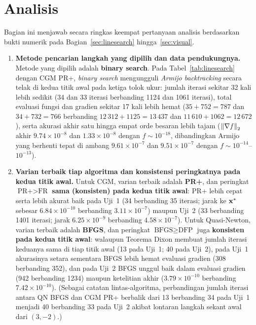 \documentclass[12pt,a4paper]{article}
\begin{document}
\section{Analisis}\label{sec:analisis}
Bagian ini menjawab secara ringkas keempat pertanyaan analisis berdasarkan bukti numerik pada Bagian~\ref{sec:linesearch}
hingga~\ref{sec:visual}.

\begin{enumerate}
  \item \textbf{Metode pencarian langkah yang dipilih dan data pendukungnya.}
  Metode yang dipilih adalah \textbf{binary search}. Pada Tabel~\ref{tab:linesearch} dengan CGM PR+, \emph{binary
  search} mengungguli \emph{Armijo backtracking} secara telak di kedua titik awal pada ketiga tolok ukur: jumlah
  iterasi sekitar 32 kali lebih sedikit (34 dan 33 iterasi berbanding 1124 dan 1061 iterasi), total evaluasi fungsi
  dan gradien sekitar 17 kali lebih hemat ($35+752=787$ dan $34+732=766$ berbanding $12\,312+1125=13\,437$ dan
  $11\,610+1062=12\,672$), serta akurasi akhir satu hingga empat orde besaran lebih tajam ($\left\lVert \nabla f\right\rVert_2$ akhir
  $9.74\times10^{-8}$ dan $1.33\times10^{-8}$ dengan $f\sim10^{-18}$, dibandingkan Armijo yang berhenti tepat di ambang
  $9.61\times10^{-7}$ dan $9.51\times10^{-7}$ dengan $f\sim10^{-14}$--$10^{-13}$).

  \item \textbf{Varian terbaik tiap algoritma dan konsistensi peringkatnya pada kedua titik awal.}
  Untuk CGM, varian terbaik adalah \textbf{PR+}, dan peringkat $\text{PR+}>\text{FR}$ \textbf{sama (konsisten) pada
  kedua titik awal}: PR+ lebih cepat serta lebih akurat baik pada Uji~1 (34 berbanding 35 iterasi; jarak ke $\mathbf{x}^*$
  sebesar $6.84\times10^{-10}$ berbanding $3.11\times10^{-7}$) maupun Uji~2 (33 berbanding 1401 iterasi; jarak
  $6.25\times10^{-9}$ berbanding $4.58\times10^{-7}$). Untuk Quasi-Newton, varian terbaik adalah \textbf{BFGS}, dan
  peringkat $\text{BFGS}\ge\text{DFP}$ juga \textbf{konsisten pada kedua titik awal}: walaupun Teorema Dixon membuat
  jumlah iterasi keduanya sama di tiap titik awal (13 pada Uji~1; 40 pada Uji~2), pada Uji~1 akurasinya setara sementara
  BFGS lebih hemat evaluasi gradien (308 berbanding 352), dan pada Uji~2 BFGS unggul baik dalam evaluasi gradien (942
  berbanding 1234) maupun ketelitian akhir ($3.79\times10^{-10}$ berbanding $7.42\times10^{-10}$). (Sebagai catatan
  lintas-algoritma, perbandingan jumlah iterasi antara QN BFGS dan CGM PR+ berbalik dari 13 berbanding 34 pada Uji~1
  menjadi 40 berbanding 33 pada Uji~2 akibat lontaran langkah sekant awal dari $(3,-2)$.)


\end{enumerate}
\end{document}
